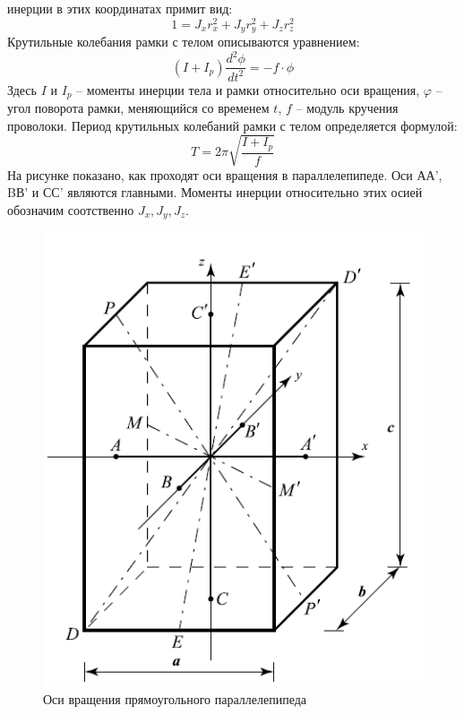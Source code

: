 \documentclass[a4paper,12pt]{article}
\begin{document}
 инерции в этих координатах примит вид:
$$
    1 = J_{x}r^{2}_{x}+J_{y}r^{2}_{y}+J_{z}r^{2}_{z}
$$
Крутильные колебания рамки с телом описываются уравнением:
$$
    (I+I_{p})\frac{d^2 \phi}{d t^2} = -f \cdot \phi
$$
Здесь $I$ и $I_{p}$ -- моменты инерции тела и рамки относительно
 оси вращения, $\varphi$ -- угол поворота рамки, меняющийся со
временем $t$, $f$ -- модуль кручения проволоки. Период крутильных
 колебаний рамки с телом определяется формулой:
$$
    T = 2\pi\sqrt{\frac{I+I_{p}}{f}}
$$
На рисунке показано, как проходят оси вращения в параллелепипеде.
 Оси АА', BВ' и СС' являются главными. Моменты инерции относительно
этих осией обозначим соотственно $J_{x}, J_{y}, J_{z}$.\\

 \begin{figure}[!h]
    \begin{center}
        \includegraphics[scale=1]{kyb}
        \caption{Оси вращения прямоугольного параллелепипеда}
        \label{graphic1}
    \end{center}
\end{figure}
\end{document}
